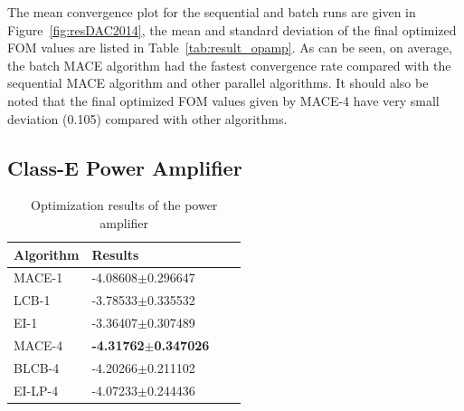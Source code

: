 The mean convergence plot for the sequential and batch runs are given in
Figure~\ref{fig:resDAC2014}, the mean and standard deviation of the final
optimized FOM values are listed in Table~\ref{tab:result_opamp}. As can be
seen, on average, the batch MACE algorithm had the fastest convergence rate
compared with the sequential MACE algorithm and other parallel algorithms. It
should also be noted that the final optimized FOM values given by MACE-4 have
very small deviation (0.105) compared with other algorithms.



\subsection{Class-E Power Amplifier}

\begin{table}[]
    \centering
    \caption{Optimization results of the power amplifier}
    \label{tab:result_PA}
    \begin{tabular}{llll}
        \toprule
        Algorithm & Results               \\ \midrule
        MACE-1    & -4.08608$\pm$0.296647 \\
        LCB-1     & -3.78533$\pm$0.335532 \\
        EI-1      & -3.36407$\pm$0.307489 \\
        MACE-4    & \textbf{-4.31762$\pm$0.347026} \\
        BLCB-4    & -4.20266$\pm$0.211102 \\
        EI-LP-4   & -4.07233$\pm$0.244436 \\
        \bottomrule
    \end{tabular}
    \vskip -0.2in
\end{table}


